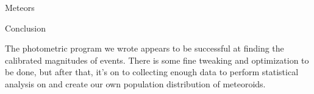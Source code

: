 \documentclass[final]{beamer}
\newlength{\onecolwid}
\begin{document}
\begin{frame}[t]
\begin{columns}[t]
\begin{column}{\onecolwid}
\begin{alertblock}{Meteors}
\end{alertblock}
\begin{block}{Conclusion}

The photometric program we wrote appears to be successful at finding the calibrated magnitudes of events. There is some fine tweaking and optimization to be done, but after that, it's on to collecting enough data to perform statistical analysis on and create our own population distribution of meteoroids. 

\end{block}
















\end{column}
\end{columns}
\end{frame}
\end{document}

